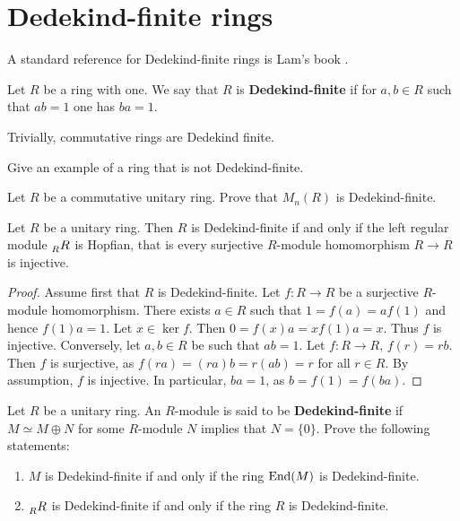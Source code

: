 
\section{Dedekind-finite rings}
\label{section:DedekindFinite}

A standard reference for Dedekind-finite rings 
is Lam's book \cite{MR2278849}. 

\begin{definition}
    Let $R$ be a ring with one. We say that $R$ is \textbf{Dedekind-finite} if 
    for $a,b\in R$ such that $ab=1$ one has $ba=1$. 
\end{definition}

Trivially, commutative rings are Dedekind finite. 

\begin{exercise}
    Give an example of a ring that is not Dedekind-finite. 
\end{exercise}

\begin{exercise}
    Let $R$ be a commutative unitary ring. Prove that $M_n(R)$ is Dedekind-finite. 
\end{exercise}

\begin{proposition}
    Let $R$ be a unitary ring. Then $R$ is Dedekind-finite if and only if the left regular module 
    $\prescript{}{R}{R}$ is Hopfian, that is 
    every surjective $R$-module homomorphism $R\to R$ is injective.
\end{proposition}

\begin{proof}
    Assume first that $R$ is Dedekind-finite. Let $f\colon R\to R$ be a surjective $R$-module homomorphism. There exists $a \in R$ such that $1=f(a)=af(1)$ and hence $f(1)a=1$. Let $x\in\ker f$. Then $0=f(x)a=xf(1)a=x$. Thus $f$ is injective. Conversely, let $a,b\in R$ be such that $ab=1$. Let $f\colon R\to R$, $f(r)=rb$. Then $f$ is surjective, as $f(ra)=(ra)b=r(ab)=r$ for all $r \in R$. By assumption, $f$ is injective. In particular, $ba=1$, as $b=f(1)=f(ba)$. 
\end{proof}

\begin{exercise}
    Let $R$ be a unitary ring. An $R$-module is said to be \textbf{Dedekind-finite}
    if $M\simeq M\oplus N$ for some $R$-module $N$ implies that $N=\{0\}$. 
    Prove the following statements:
    \begin{enumerate}
        \item $M$ is Dedekind-finite if and only if the ring 
            $\operatorname{End}(M)$ is Dedekind-finite. 
        \item $\prescript{}{R}{R}$ is Dedekind-finite if and only if the ring $R$ is Dedekind-finite. 
    \end{enumerate}
\end{exercise}

